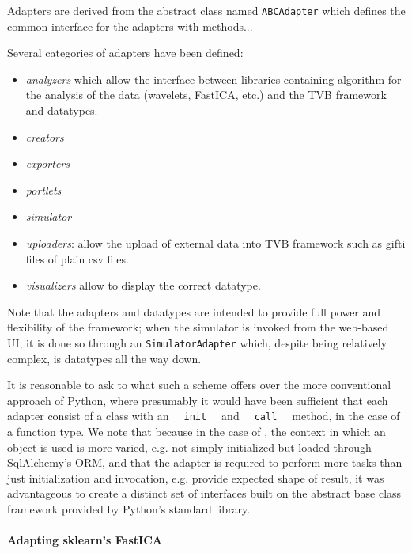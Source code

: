 Adapters are derived from the abstract class named \texttt{ABCAdapter} which
defines the common interface for the adapters with methods...

Several categories of adapters have been defined: 
\begin{itemize}
    \item \textit{analyzers} which allow the interface between libraries
        containing algorithm for the analysis of the data (wavelets, FastICA,
        etc.) and the TVB framework and datatypes.
    \item \textit{creators}
    \item \textit{exporters} 
    \item \textit{portlets} 
    \item \textit{simulator}
\item \textit{uploaders}: allow the upload of external data into TVB framework
    such as gifti files of plain csv files.
\item \textit{visualizers}  allow
    to display the correct datatype.
\end{itemize}



Note that the adapters and datatypes are intended to provide full 
power and flexibility of the framework; when the simulator is invoked from
the web-based UI, it is done so through an \texttt{SimulatorAdapter} which,
despite being relatively complex, is datatypes all the way down.

It is reasonable to ask to what such a scheme offers over the more 
conventional approach of Python, where presumably it would have been
sufficient that each adapter consist of a class with an \texttt{\_\_init\_\_}
and \texttt{\_\_call\_\_} method, in the case of a function type. 
We note that because in the case of \TVB, the context in which an object
is used is more varied, e.g. not simply initialized but loaded through 
SqlAlchemy's ORM, and that the adapter is required to perform more tasks
than just initialization and invocation, e.g. provide expected shape of 
result, it was advantageous to create a distinct set of interfaces built
on the abstract base class framework provided by Python's standard library.

\paragraph{Adapting sklearn's FastICA}


